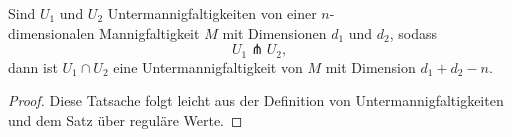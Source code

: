 \begin{prop}
    \label{prop: schnitt von transversalen untermannigfaltigkeiten}
    Sind $U_1$ und $U_2$ Untermannigfaltigkeiten von einer $n$-\\
    dimensionalen Mannigfaltigkeit $M$ mit 
    Dimensionen $d_1$ und $d_2$, sodass 
    \[ U_1 \pitchfork U_2 , \]
    dann ist $U_1 \cap U_2$ eine Untermannigfaltigkeit von $M$ mit Dimension $d_1 + d_2 - n$.
\end{prop}

\begin{proof}
    Diese Tatsache folgt leicht aus der Definition von Untermannigfaltigkeiten und dem Satz über 
    reguläre Werte.
\end{proof}


